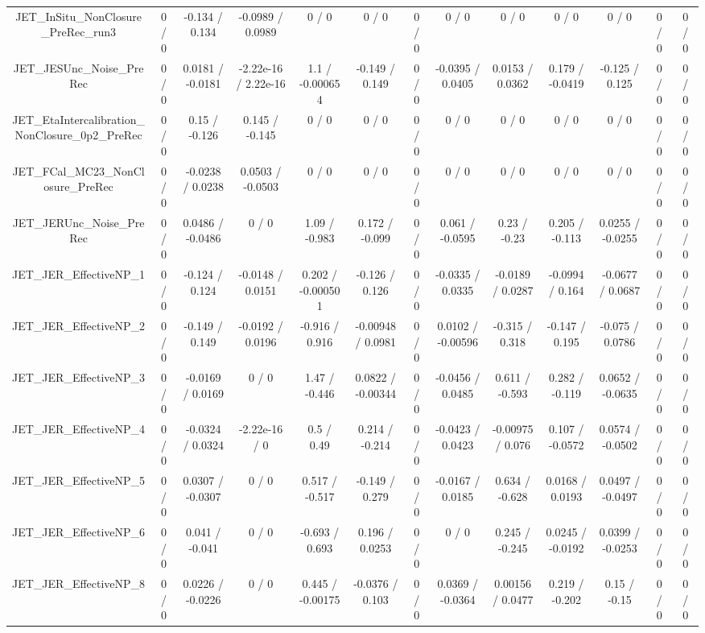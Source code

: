 \documentclass[10pt]{article}
\begin{document}
\begin{table}[htbp]
\begin{center}
\begin{tabular}{|c|c|c|c|c|c|c|c|c|c|c|c|c|}
  JET_InSitu_NonClosure_PreRec_run3 & 0 / 0 & -0.134 / 0.134 & -0.0989 / 0.0989 & 0 / 0 & 0 / 0 & 0 / 0 & 0 / 0 & 0 / 0 & 0 / 0 & 0 / 0 & 0 / 0 & 0 / 0 \\ 
  JET_JESUnc_Noise_PreRec & 0 / 0 & 0.0181 / -0.0181 & -2.22e-16 / 2.22e-16 & 1.1 / -0.000654 & -0.149 / 0.149 & 0 / 0 & -0.0395 / 0.0405 & 0.0153 / 0.0362 & 0.179 / -0.0419 & -0.125 / 0.125 & 0 / 0 & 0 / 0 \\ 
  JET_EtaIntercalibration_NonClosure_0p2_PreRec & 0 / 0 & 0.15 / -0.126 & 0.145 / -0.145 & 0 / 0 & 0 / 0 & 0 / 0 & 0 / 0 & 0 / 0 & 0 / 0 & 0 / 0 & 0 / 0 & 0 / 0 \\ 
  JET_FCal_MC23_NonClosure_PreRec & 0 / 0 & -0.0238 / 0.0238 & 0.0503 / -0.0503 & 0 / 0 & 0 / 0 & 0 / 0 & 0 / 0 & 0 / 0 & 0 / 0 & 0 / 0 & 0 / 0 & 0 / 0 \\ 
  JET_JERUnc_Noise_PreRec & 0 / 0 & 0.0486 / -0.0486 & 0 / 0 & 1.09 / -0.983 & 0.172 / -0.099 & 0 / 0 & 0.061 / -0.0595 & 0.23 / -0.23 & 0.205 / -0.113 & 0.0255 / -0.0255 & 0 / 0 & 0 / 0 \\ 
  JET_JER_EffectiveNP_1 & 0 / 0 & -0.124 / 0.124 & -0.0148 / 0.0151 & 0.202 / -0.000501 & -0.126 / 0.126 & 0 / 0 & -0.0335 / 0.0335 & -0.0189 / 0.0287 & -0.0994 / 0.164 & -0.0677 / 0.0687 & 0 / 0 & 0 / 0 \\ 
  JET_JER_EffectiveNP_2 & 0 / 0 & -0.149 / 0.149 & -0.0192 / 0.0196 & -0.916 / 0.916 & -0.00948 / 0.0981 & 0 / 0 & 0.0102 / -0.00596 & -0.315 / 0.318 & -0.147 / 0.195 & -0.075 / 0.0786 & 0 / 0 & 0 / 0 \\ 
  JET_JER_EffectiveNP_3 & 0 / 0 & -0.0169 / 0.0169 & 0 / 0 & 1.47 / -0.446 & 0.0822 / -0.00344 & 0 / 0 & -0.0456 / 0.0485 & 0.611 / -0.593 & 0.282 / -0.119 & 0.0652 / -0.0635 & 0 / 0 & 0 / 0 \\ 
  JET_JER_EffectiveNP_4 & 0 / 0 & -0.0324 / 0.0324 & -2.22e-16 / 0 & 0.5 / 0.49 & 0.214 / -0.214 & 0 / 0 & -0.0423 / 0.0423 & -0.00975 / 0.076 & 0.107 / -0.0572 & 0.0574 / -0.0502 & 0 / 0 & 0 / 0 \\ 
  JET_JER_EffectiveNP_5 & 0 / 0 & 0.0307 / -0.0307 & 0 / 0 & 0.517 / -0.517 & -0.149 / 0.279 & 0 / 0 & -0.0167 / 0.0185 & 0.634 / -0.628 & 0.0168 / 0.0193 & 0.0497 / -0.0497 & 0 / 0 & 0 / 0 \\ 
  JET_JER_EffectiveNP_6 & 0 / 0 & 0.041 / -0.041 & 0 / 0 & -0.693 / 0.693 & 0.196 / 0.0253 & 0 / 0 & 0 / 0 & 0.245 / -0.245 & 0.0245 / -0.0192 & 0.0399 / -0.0253 & 0 / 0 & 0 / 0 \\ 
  JET_JER_EffectiveNP_8 & 0 / 0 & 0.0226 / -0.0226 & 0 / 0 & 0.445 / -0.00175 & -0.0376 / 0.103 & 0 / 0 & 0.0369 / -0.0364 & 0.00156 / 0.0477 & 0.219 / -0.202 & 0.15 / -0.15 & 0 / 0 & 0 / 0 \\ 

\end{tabular}
\end{center}
\end{table}
\end{document}
